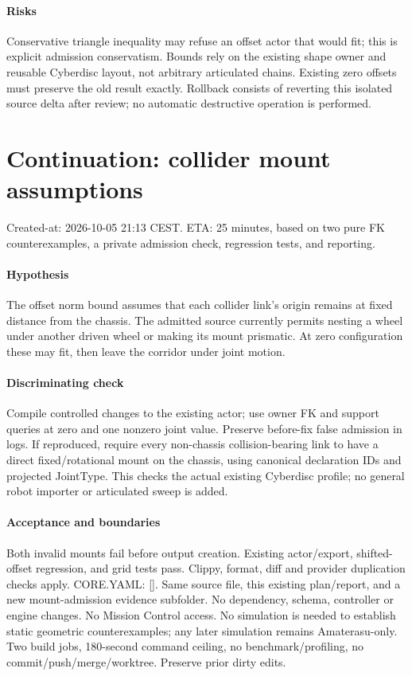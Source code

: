 \documentclass{article}
\begin{document}
\paragraph{Risks} Conservative triangle inequality may refuse an offset actor
that would fit; this is explicit admission conservatism. Bounds rely on the
existing shape owner and reusable Cyberdisc layout, not arbitrary articulated
chains. Existing zero offsets must preserve the old result exactly.
Rollback consists of reverting this isolated source delta after review; no
automatic destructive operation is performed.


\section*{Continuation: collider mount assumptions}
Created-at: 2026-10-05 21:13 CEST. ETA: 25 minutes, based on two pure FK
counterexamples, a private admission check, regression tests, and reporting.

\paragraph{Hypothesis} The offset norm bound assumes that each collider link's
origin remains at fixed distance from the chassis. The admitted source currently
permits nesting a wheel under another driven wheel or making its mount prismatic.
At zero configuration these may fit, then leave the corridor under joint motion.

\paragraph{Discriminating check} Compile controlled changes to the existing actor;
use owner FK and support queries at zero and one nonzero joint value. Preserve
before-fix false admission in logs. If reproduced, require every non-chassis
collision-bearing link to have a direct fixed/rotational mount on the chassis,
using canonical declaration IDs and projected JointType. This checks the actual
existing Cyberdisc profile; no general robot importer or articulated sweep is added.

\paragraph{Acceptance and boundaries} Both invalid mounts fail before output
creation. Existing actor/export, shifted-offset regression, and grid tests pass.
Clippy, format, diff and provider duplication checks apply. CORE.YAML: []. Same
source file, this existing plan/report, and a new mount-admission evidence subfolder.
No dependency, schema, controller or engine changes. No Mission Control access.
No simulation is needed to establish static geometric counterexamples; any later
simulation remains Amaterasu-only. Two build jobs, 180-second command ceiling,
no benchmark/profiling, no commit/push/merge/worktree. Preserve prior dirty edits.
\end{document}
